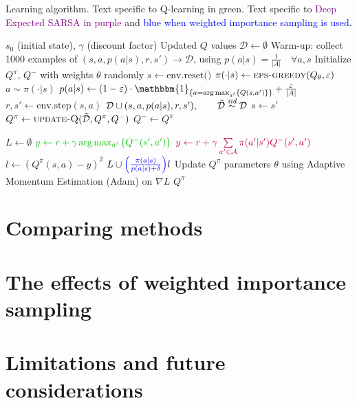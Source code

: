 \documentclass{article}
\begin{document}
\begin{algorithm}
    \caption{Learning algorithm. Text specific to \textcolor{dgreen}{Q-learning in green}. Text specific to \textcolor{purple}{Deep Expected SARSA in purple} and \textcolor{blue}{blue when weighted importance sampling is used}.}
    \begin{algorithmic}[1]
        \Require $s_0$ (initial state), $\gamma$ (discount factor)
        \Ensure Updated $Q$ values
        \State \(\mathcal{D} \gets \emptyset\)
        \State Warm-up: collect 1000 examples of $(s, a, p(a|s), r, s') \rightarrow \mathcal{D}$, using $p(a|s) = \frac{1}{|A|} \quad \forall a, s$
        \State Initialize $Q^\pi$, $Q^-$ with weights \(\theta\) randomly
        \Repeat
            \State $s \gets \text{env.reset()}$
            \Repeat
                \State $\pi(\cdot | s) \gets \Call{eps-greedy}{Q_\theta, \eps}$
                \State $a \sim \pi(\cdot|s)$
                \State $p(a|s) \gets (1 - \eps) \cdot \mathbbm{1}_{\set{a = \arg\max_{a'}\set{Q(s,a')}}} + \frac{\eps}{|A|}$
                \State $r, s' \gets \text{env.step}(s, a)$
                \State $\mathcal{D} \cup (s, a, p(a|s), r, s'),\qquad \tilde{\mathcal{D}} \overset{\textit{iid}}{\sim}\mathcal{D}$
                \State $s \gets s'$
                \State $Q^\pi \gets \Call{update-Q}{\tilde{\mathcal{D}}, Q^\pi, Q^-}$
                    \State $Q^- \gets Q^\pi$
                \EndIf
        
            \State $L \gets \emptyset$
                \State $\textcolor{dgreen}{y \gets r + \gamma \arg\max_{a'}\set{Q^-(s',a')}}$
                \State $\textcolor{purple}{y \gets r + \gamma \sum\limits_{a' \in \mathcal{A}} \pi(a' | s') Q^-(s', a')}$
                \State $l \gets (Q^\pi(s, a) - y)^2$
                \State $L \cup \textcolor{blue}{\left( \frac{\pi(a|s)}{p(a|s) + \delta} \right)} l$ %
                \EndFor
            \State Update $Q^\pi$ parameters \(\theta\) using Adaptive Momentum Estimation (Adam) on \(\nabla L\)
            \State \Return $Q^\pi$
        \EndProcedure
    \end{algorithmic}
\end{algorithm}

\section{Comparing methods}
\section{The effects of weighted importance sampling}
\section{Limitations and future considerations}
\end{document}
